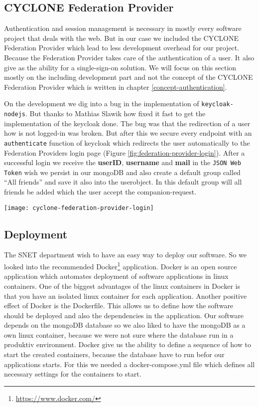 \subsection{CYCLONE Federation Provider}
\label{federation-provider}

Authentication and session management is necessary in mostly every software project that deals with the web. But in our case we included the CYCLONE Federation Provider which lead to less development overhead for our project. Because the Federation Provider takes care of the authentication of a user. It also give as the ability for a single-sign-on solution. We will focus on this section mostly on the including development part and not the concept of the CYCLONE Federation Provider which is written in chapter \ref{concept-authentication}.

On the development we dig into a bug in the implementation of \texttt{keycloak-nodejs}. But thanks to Mathias Slawik how fixed it fast to get the implementation of the keycloak done. The bug was that the redirection of a user how is not logged-in was broken. But after this we secure every endpoint with an \texttt{authenticate} function of keycloak which redirects the user automatically to the Federation Providers login page (Figure \ref{fig:federation-provider-login}). After a successful login we receive the \textbf{userID}, \textbf{username} and \textbf{mail} in the \texttt{JSON Web Token} wish we persist in our mongoDB and also create a default group called \enquote{All friends} and save it also into the userobject. In this default group will all friends be added which the user accept the companion-request.

\begin{center}
    \texttt{[image: cyclone-federation-provider-login]}\\
    \label{fig:federation-provider-login}
\end{center}

\subsection{Deployment}

The SNET department wish to have an easy way to deploy our software. So we looked into the recommended Docker\footnote{\url{https://www.docker.com/}} application. Docker is an open source application which automates deployment of software applications in linux containers. One of the biggest advantages of the linux containers in Docker is that you have an isolated linux container for each application. Another positive effect of Docker is the Dockerfile. This allows us to define how the software should be deployed and also the dependencies in the application. Our software depends on the mongoDB database so we also liked to have the mongoDB as a own linux container, because we were not sure where the database run in a produktiv environment. Docker give us the ability to define a sequence of how to start the created containers, because the database have to run befor our applications starts. For this we needed a docker-compose.yml file which defines all necessary settings for the containers to start.

